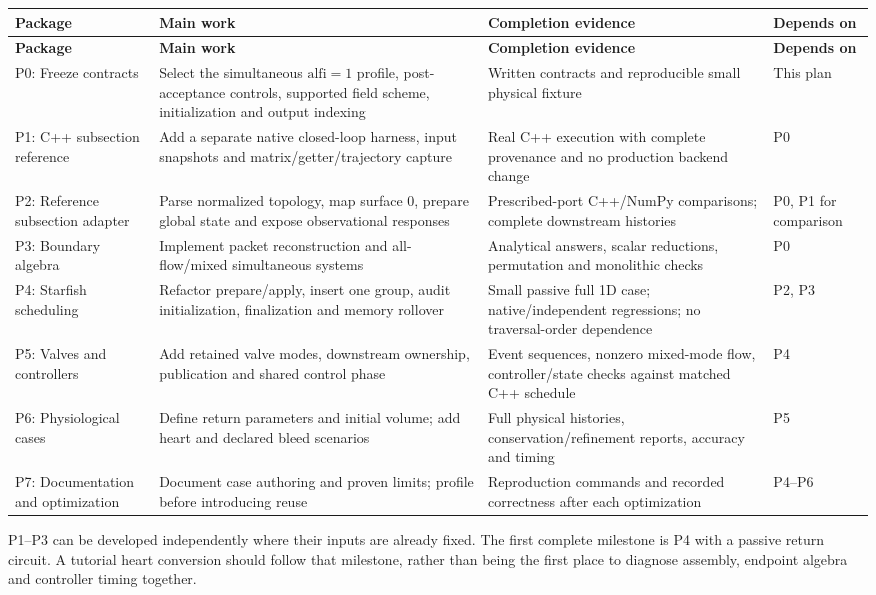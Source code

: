 \documentclass[11pt,a4paper]{article}
\begin{document}
\begingroup\footnotesize
\setlength{\tabcolsep}{4pt}
\renewcommand{\arraystretch}{1.17}
\begin{longtable}{>{\raggedright\arraybackslash}p{}>{\raggedright\arraybackslash}p{}>{\raggedright\arraybackslash}p{}>{\raggedright\arraybackslash}p{}}
\toprule
\textbf{Package} & \textbf{Main work} & \textbf{Completion evidence} & \textbf{Depends on} \\
\midrule
\endfirsthead
\textbf{Package} & \textbf{Main work} & \textbf{Completion evidence} & \textbf{Depends on} \\
\midrule
\endhead
\bottomrule
\endfoot
P0: Freeze contracts & Select the simultaneous \(\mathrm{alfi}=1\) profile, post-acceptance controls, supported field scheme, initialization and output indexing & Written contracts and reproducible small physical fixture & This plan \\[3pt]
P1: C++ subsection reference & Add a separate native closed-loop harness, input snapshots and matrix/getter/trajectory capture & Real C++ execution with complete provenance and no production backend change & P0 \\[3pt]
P2: Reference subsection adapter & Parse normalized topology, map surface 0, prepare global state and expose observational responses & Prescribed-port C++/NumPy comparisons; complete downstream histories & P0, P1 for comparison \\[3pt]
P3: Boundary algebra & Implement packet reconstruction and all-flow/mixed simultaneous systems & Analytical answers, scalar reductions, permutation and monolithic checks & P0 \\[3pt]
P4: Starfish scheduling & Refactor prepare/apply, insert one group, audit initialization, finalization and memory rollover & Small passive full 1D case; native/independent regressions; no traversal-order dependence & P2, P3 \\[3pt]
P5: Valves and controllers & Add retained valve modes, downstream ownership, publication and shared control phase & Event sequences, nonzero mixed-mode flow, controller/state checks against matched C++ schedule & P4 \\[3pt]
P6: Physiological cases & Define return parameters and initial volume; add heart and declared bleed scenarios & Full physical histories, conservation/refinement reports, accuracy and timing & P5 \\[3pt]
P7: Documentation and optimization & Document case authoring and proven limits; profile before introducing reuse & Reproduction commands and recorded correctness after each optimization & P4--P6 \\[3pt]
\end{longtable}
\endgroup
P1--P3 can be developed independently where their inputs are already fixed. The first complete milestone is P4 with a passive return circuit. A tutorial heart conversion should follow that milestone, rather than being the first place to diagnose assembly, endpoint algebra and controller timing together.
\end{document}

